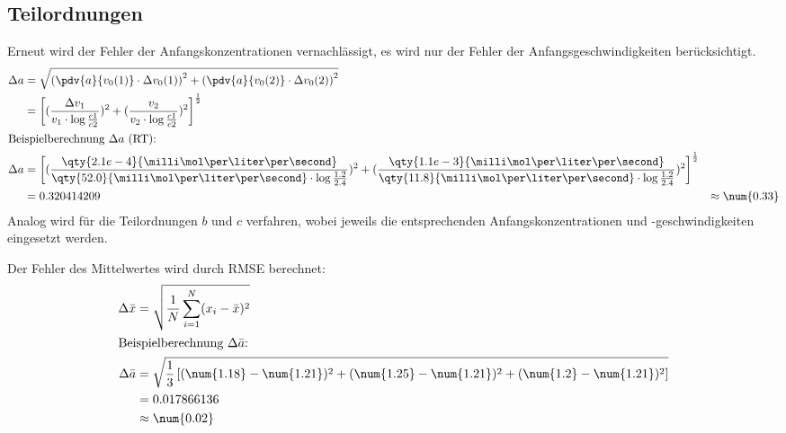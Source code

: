 \subsection{Teilordnungen}
Erneut wird der Fehler der Anfangskonzentrationen vernachlässigt, es wird nur der Fehler der Anfangsgeschwindigkeiten berücksichtigt.
\begin{align*}
    \Delta a &= \sqrt{\left( \pdv{a}{v_0(1)} \cdot \Delta v_0(1) \right)^2 + \left( \pdv{a}{v_0(2)} \cdot \Delta v_0(2) \right)^2} \\
             &= \left[ (\frac{\Delta v_1}{v_1 \cdot \log \frac{c1}{c2}})^2 + (\frac{v_2}{v_2 \cdot \log \frac{c1}{c2}})^2 \right]^{\frac{1}{2}} \\
    \intertext{Beispielberechnung $\Delta a$ (RT):}
    \Delta a &= \left[ (\frac{\qty{2.1e-4}{\milli\mol\per\liter\per\second}}{\qty{52.0}{\milli\mol\per\liter\per\second} \cdot \log \frac{1.2}{2.4}})^2 + (\frac{\qty{1.1e-3}{\milli\mol\per\liter\per\second}}{\qty{11.8}{\milli\mol\per\liter\per\second} \cdot \log \frac{1.2}{2.4}})^2 \right]^{\frac{1}{2}} \\
             &= 0.320414209
             &\approx \num{0.33}
\end{align*}
Analog wird für die Teilordnungen $b$ und $c$ verfahren, wobei jeweils die entsprechenden Anfangskonzentrationen und -geschwindigkeiten eingesetzt werden.

Der Fehler des Mittelwertes wird durch RMSE berechnet:
\begin{align*}
    \Delta \bar{x} &= \sqrt{\frac{1}{N} \sum_{i=1}^{N} (x_i - \bar{x})^2} \\
    \intertext{Beispielberechnung $\Delta \bar{a}$:}
    \Delta \bar{a} &= \sqrt{\frac{1}{3} \left[ (\num{1.18} - \num{1.21})^2 + (\num{1.25} - \num{1.21})^2 + (\num{1.2} - \num{1.21})^2 \right]} \\
                    &= 0.017866136 \\
                   &\approx \num{0.02}
\end{align*}

